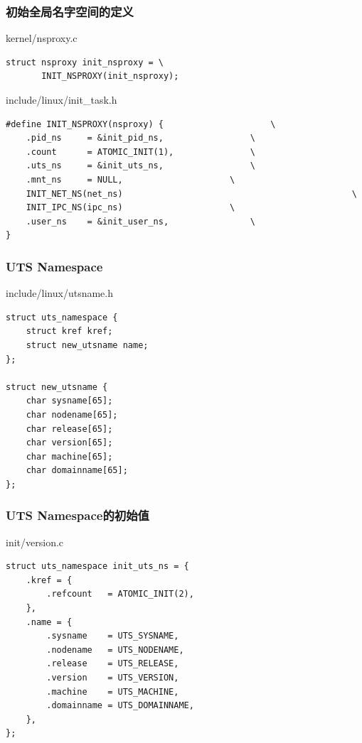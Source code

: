 \documentclass[xcolor=svgnames]{beamer}
\begin{document}
\begin{CJK*}{UTF8}{gbsn}
\begin{frame}[fragile]
\frametitle{初始全局名字空间的定义}
\begin{block}{kernel/nsproxy.c}
\begin{verbatim}
struct nsproxy init_nsproxy = \
       INIT_NSPROXY(init_nsproxy);
\end{verbatim}
\end{block}
\begin{block}{include/linux/init\_task.h}
\begin{verbatim}
#define INIT_NSPROXY(nsproxy) {                     \
    .pid_ns     = &init_pid_ns,                 \
    .count      = ATOMIC_INIT(1),               \
    .uts_ns     = &init_uts_ns,                 \
    .mnt_ns     = NULL,                     \
    INIT_NET_NS(net_ns)                                             \
    INIT_IPC_NS(ipc_ns)                     \
    .user_ns    = &init_user_ns,                \
}

\end{verbatim}
\end{block}
\end{frame}

\begin{frame}[fragile]
\frametitle{UTS Namespace}
\begin{block}{include/linux/utsname.h}
\begin{verbatim}
struct uts_namespace {
    struct kref kref;
    struct new_utsname name;
};

struct new_utsname {
    char sysname[65];
    char nodename[65];
    char release[65];
    char version[65];
    char machine[65];
    char domainname[65];
};
\end{verbatim}
\end{block}
\end{frame}
\begin{frame}[fragile]
\frametitle{UTS Namespace的初始值}
\begin{block}{init/version.c}
\begin{verbatim}
struct uts_namespace init_uts_ns = {
    .kref = {
        .refcount   = ATOMIC_INIT(2),
    },
    .name = {
        .sysname    = UTS_SYSNAME,
        .nodename   = UTS_NODENAME,
        .release    = UTS_RELEASE,
        .version    = UTS_VERSION,
        .machine    = UTS_MACHINE,
        .domainname = UTS_DOMAINNAME,
    },
};
\end{verbatim}
\end{block}
\end{frame}


\end{CJK*}
\end{document}
